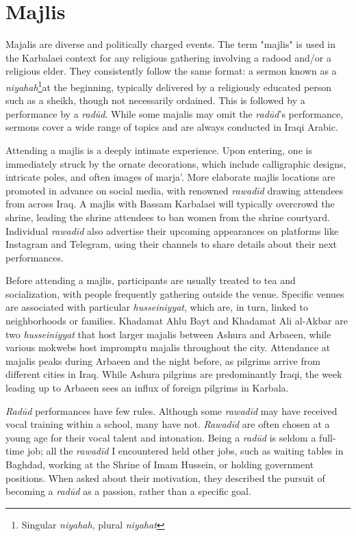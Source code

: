 \section{Majlis} \label{majlis}
Majalis are diverse and politically charged events. The term "majlis" is used in the Karbalaei context for any religious gathering involving a radood and/or a religious elder. They consistently follow the same format: a sermon known as a \emph{niyahah}\footnote{Singular \emph{niyahah}, plural \emph{niyahat}}at the beginning, typically delivered by a religiously educated person such as a sheikh, though not necessarily ordained. This is followed by a performance by a \emph{radūd}. While some majalis may omit the \emph{radūd}'s performance, sermons cover a wide range of topics and are always conducted in Iraqi Arabic.

Attending a majlis is a deeply intimate experience. Upon entering, one is immediately struck by the ornate decorations, which include calligraphic designs, intricate poles, and often images of marja'. More elaborate majlis locations are promoted in advance on social media, with renowned \emph{rawadīd} drawing attendees from across Iraq. A majlis with Bassam Karbalaei will typically overcrowd the shrine, leading the shrine attendees to ban women from the shrine courtyard. Individual \emph{rawadīd} also advertise their upcoming appearances on platforms like Instagram and Telegram, using their channels to share details about their next performances.

Before attending a majlis, participants are usually treated to tea and socialization, with people frequently gathering outside the venue. Specific venues are associated with particular \emph{husseiniyyat}, which are, in turn, linked to neighborhoods or families. Khadamat Ahlu Bayt and Khadamat Ali al-Akbar are two \emph{husseiniyyat} that host larger majalis between Ashura and Arbaeen, while various mokwebs host impromptu majalis throughout the city. Attendance at majalis peaks during Arbaeen and the night before, as pilgrims arrive from different cities in Iraq. While Ashura pilgrims are predominantly Iraqi, the week leading up to Arbaeen sees an influx of foreign pilgrims in Karbala.

\emph{Radūd} performances have few rules. Although some \emph{rawadīd} may have received vocal training within a school, many have not. \emph{Rawadīd} are often chosen at a young age for their vocal talent and intonation. Being a \emph{radūd} is seldom a full-time job; all the \emph{rawadīd} I encountered held other jobs, such as waiting tables in Baghdad, working at the Shrine of Imam Hussein, or holding government positions. When asked about their motivation, they described the pursuit of becoming a \emph{radūd} as a passion, rather than a specific goal.

